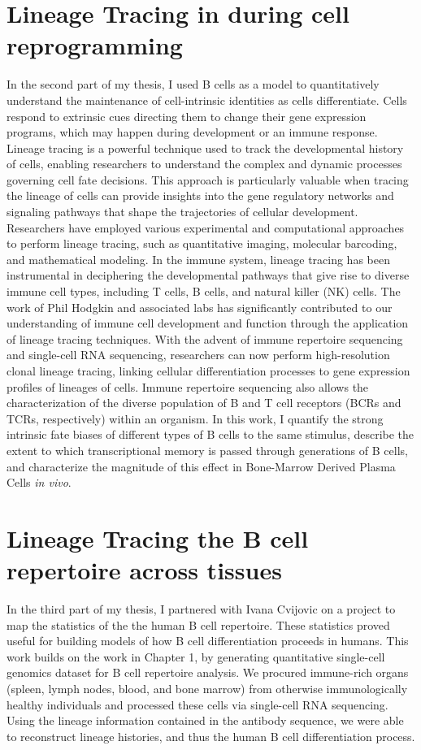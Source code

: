 \section{Lineage Tracing in during cell reprogramming}
In the second part of my thesis, I used B cells as a model to quantitatively understand the maintenance of cell-intrinsic identities as cells differentiate. Cells respond to extrinsic cues directing them to change their gene expression programs, which may happen during development or an immune response. Lineage tracing is a powerful technique used to track the developmental history of cells, enabling researchers to understand the complex and dynamic processes governing cell fate decisions. This approach is particularly valuable when tracing the lineage of cells can provide insights into the gene regulatory networks and signaling pathways that shape the trajectories of cellular development. Researchers have employed various experimental and computational approaches to perform lineage tracing, such as quantitative imaging, molecular barcoding, and mathematical modeling\cite{alon2006introduction, lauffenburger2000quantitative, munsky2012using}. In the immune system, lineage tracing has been instrumental in deciphering the developmental pathways that give rise to diverse immune cell types, including T cells, B cells, and natural killer (NK) cells. The work of Phil Hodgkin and associated labs has significantly contributed to our understanding of immune cell development and function through the application of lineage tracing techniques\cite{hodgkin2012cell, marchingo2014t}. With the advent of immune repertoire sequencing and single-cell RNA sequencing, researchers can now perform high-resolution clonal lineage tracing, linking cellular differentiation processes to gene expression profiles of lineages of cells\cite{stubbington2017t, horns2020memory}. Immune repertoire sequencing also allows the characterization of the diverse population of B and T cell receptors (BCRs and TCRs, respectively) within an organism\cite{robins2013immunosequencing, georgiou_promise_2014}. In this work, I quantify the strong intrinsic fate biases of different types of B cells to the same stimulus, describe the extent to which transcriptional memory is passed through generations of B cells, and characterize the magnitude of this effect in Bone-Marrow Derived Plasma Cells \textit{in vivo}.
\section{Lineage Tracing the B cell repertoire across tissues}
In the third part of my thesis, I partnered with Ivana Cvijovic on a project to map the statistics of the the human B cell repertoire. These statistics proved useful for building models of how B cell differentiation proceeds in humans. This work builds on the work in Chapter 1, by generating quantitative single-cell genomics dataset for B cell repertoire analysis. We procured immune-rich organs (spleen, lymph nodes, blood, and bone marrow) from otherwise immunologically healthy individuals and processed these cells via single-cell RNA sequencing. Using the lineage information contained in the antibody sequence, we were able to reconstruct lineage histories, and thus the human B cell differentiation process.
